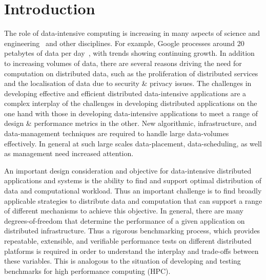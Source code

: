 \documentclass{rspublic}
\begin{document}
\vspace{-0.3cm}

\section{Introduction} 
The role of data-intensive computing is increasing in many aspects of
science and engineering~\citep{fourthparadigm} and other
disciplines. For example, Google processes around 20 petabytes of data
per day~\citep{google}, with trends showing continuing growth. In
addition to increasing volumes of data, there are several reasons
driving the need for computation on distributed data, such as the
proliferation of distributed services and the localisation of data due
to security \& privacy issues. The challenges in developing effective
and efficient distributed data-intensive applications are a complex
interplay of the challenges in developing distributed applications on
the one hand with those in developing data-intensive applications to
meet a range of design \& performance metrics in the other. New
algorithmic, infrastructure, and data-management techniques are
required to handle large data-volumes effectively. In general at such
large scales data-placement, data-scheduling, as well as management
need increased attention.

An important design consideration and objective for data-intensive
distributed applications and systems is the ability to find and
support optimal distribution of data and computational workload. Thus
an important challenge is to find broadly applicable strategies to
distribute data and computation that can support a range of different
mechanisms to achieve this objective. In general, there are many
degrees-of-freedom that determine the performance of a given
application on distributed infrastructure. Thus a rigorous
benchmarking process, which provides repeatable, extensible, and
verifiable performance tests on different distributed platforms is
required in order to understand the interplay and trade-offs between
these variables. This is analogous to the situation of developing and
testing benchmarks for high performance computing (HPC). 
\end{document}
